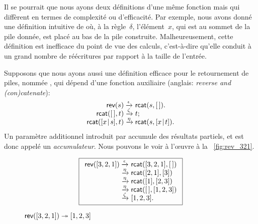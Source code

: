 \hspace*{-2pt} Il se pourrait que nous ayons deux définitions d'une
même fonction mais qui diffèrent en termes de complexité ou
d'efficacité. Par exemple, nous avons donné une définition intuitive
de  où, à la
règle~\(\delta\), l'élément~\(x\), qui est au sommet de la pile
donnée, est placé au bas de la pile construite. Malheureusement, cette
définition est inefficace du point de vue des calculs, c'est-à-dire
qu'elle conduit à un grand nombre de réécritures par rapport à la
taille de l'entrée.

Supposons que nous ayons aussi une définition efficace pour le
retournement de piles, nommée , qui
dépend d'une fonction auxiliaire
(anglais: \emph{reverse and (con)catenate}):
\begin{equation}
  \begin{array}{@{}r@{\;}l@{\;}l@{}}
    \fun{rev}(s) & \smashedrightarrow{\epsilon} & \fun{rcat}(s,\el).\\
    \fun{rcat}(\el,t) & \smashedrightarrow{\zeta} & t;\\
    \fun{rcat}(\cons{x}{s},t) & \smashedrightarrow{\eta} &
    \fun{rcat}(s,\cons{x}{t}).
  \end{array}
  \label{def:rev}
\end{equation}
Un paramètre additionnel introduit par  accumule des
résultats partiels, et est donc appelé un
\emph{accumulateur}. Nous
pouvons le voir à l'œuvre à la \fig~\vref{fig:rev_321}.
\begin{figure}[b]
\begin{equation*}
\boxed{%
\begin{array}{r@{\;}l@{\;}l}
\fun{rev}([3,2,1])
& \xrightarrow{\smash{\epsilon}} & \fun{rcat}([3,2,1],\el)\\
& \xrightarrow{\smash{\eta}}     & \fun{rcat}([2,1],[3])\\
& \xrightarrow{\smash{\eta}}     & \fun{rcat}([1],[2,3])\\
& \xrightarrow{\smash{\eta}}     & \fun{rcat}(\el,[1,2,3])\\
& \xrightarrow{\smash{\zeta}}    & [1,2,3].
\end{array}}
\end{equation*}
\caption{\(\textsf{rev}([3,2,1]) \twoheadrightarrow [1,2,3]\)}
\label{fig:rev_321}
\end{figure}

